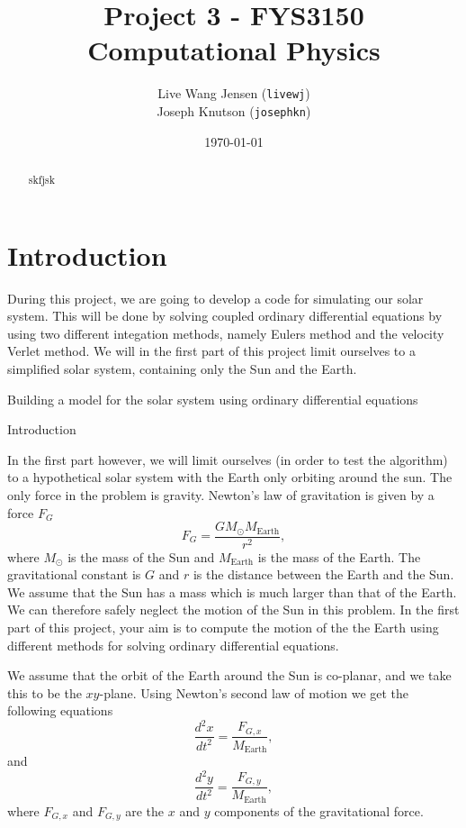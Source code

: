 \documentclass[11pt,a4paper]{article}
\begin{document}
\title{Project 3 - FYS3150 Computational Physics}
\author{Live Wang Jensen (\texttt{livewj}) \\ Joseph Knutson (\texttt{josephkn})}
\date{\today}

\maketitle

\begin{abstract}
skfjsk
\end{abstract}

\tableofcontents

\clearpage
\section{Introduction}
During this project, we are going to develop a code for simulating our solar system. This will be done by solving coupled ordinary differential equations by using two different integation methods, namely Eulers method and the velocity Verlet method. We will in the first part of this project limit ourselves to a simplified solar system, containing only the Sun and the Earth. 

Building a model for the solar system using ordinary differential equations

Introduction

In the first part however, we will limit ourselves (in order to test the algorithm) 
to a hypothetical solar system
with the Earth only orbiting around the sun.
The only force in the problem is gravity. Newton's law of gravitation  is given by a force $F_G$
\[
F_G=\frac{GM_{\odot}M_{\mathrm{Earth}}}{r^2},
\]
where $M_{\odot}$ is the mass of the Sun and $M_{\mathrm{Earth}}$ is the mass of the Earth. The gravitational constant is $G$ and $r$ is the distance between the Earth and the Sun.
We assume that the Sun has a mass which is much larger 
than that of the Earth. We can therefore safely neglect the 
motion of the Sun in this problem.  In the first part of this project, your aim is to compute the motion
of the the Earth using different methods for solving ordinary differential equations.

We assume that the orbit of the Earth around the Sun 
is co-planar, and we take this to be the $xy$-plane.
Using Newton's second law of motion we get the following equations
\[
\frac{d^2x}{dt^2}=\frac{F_{G,x}}{M_{\mathrm{Earth}}},
\]
and 
\[
\frac{d^2y}{dt^2}=\frac{F_{G,y}}{M_{\mathrm{Earth}}},
\]
where $F_{G,x}$ and $F_{G,y}$ are the $x$ and $y$ components of the gravitational force. 
\end{document}
